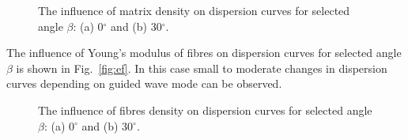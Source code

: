 \begin{figure} [h!]
 	\centering
 	\begin{subfigure}[b]{0.49\textwidth}
 		\centering
 		
 		
 		

 		\caption{}
 		\label{fig:rhom0}
 	\end{subfigure}
 	\hfill
 	\begin{subfigure}[b]{0.49\textwidth}
 		\centering
 		
 		
 		
 	
 		\caption{}
 		\label{fig:rhom30}
 	\end{subfigure}






















 	
\caption{The influence of matrix density on dispersion curves for selected angle 
 	\(\beta\): (a) 0\(^{\circ}\) and (b) 30\(^{\circ}\).}
 
 	\label{fig:rhom}
 \end{figure}

The influence of Young's modulus of fibres on dispersion curves for selected angle 
\(\beta\) is shown in Fig.~\ref{fig:ef}. In this case small to moderate changes in 
dispersion curves depending on guided wave mode can be observed. 


\begin{figure} [h!]
	\centering
	\begin{subfigure}[b]{0.49\textwidth}
		\centering
		
		

		\caption{}
		\label{fig:rhof0}
	\end{subfigure}
	\hfill
	\begin{subfigure}[b]{0.49\textwidth}
		\centering
		
		
	
		\caption{}
		\label{fig:rhof30}
	\end{subfigure}






















	
\caption{The influence of fibres density on dispersion curves for selected angle 
	\(\beta\): (a) 0\(^{\circ}\) and (b) 30\(^{\circ}\).}
 
	\label{fig:rhof}
\end{figure}

